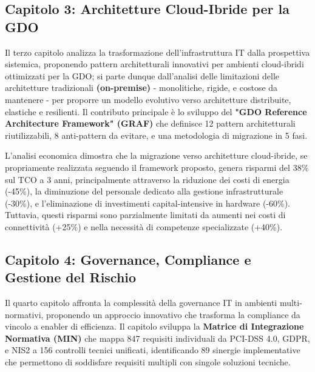 
\subsection{Capitolo 3: Architetture Cloud-Ibride per la GDO}

Il terzo capitolo analizza la trasformazione dell'infrastruttura IT dalla prospettiva sistemica, proponendo pattern architetturali innovativi per ambienti cloud-ibridi ottimizzati per la GDO; si parte dunque dall'analisi delle limitazioni delle architetture tradizionali \textbf{(on-premise)} - monolitiche, rigide, e costose da mantenere - per proporre un modello evolutivo verso architetture distribuite, elastiche e resilienti. Il contributo principale è lo sviluppo del \textbf{"GDO Reference Architecture Framework" (GRAF)} che definisce 12 pattern architetturali riutilizzabili, 8 anti-pattern da evitare, e una metodologia di migrazione in 5 fasi.

L'analisi economica dimostra che la migrazione verso architetture cloud-ibride, se propriamente realizzata seguendo il framework proposto, genera risparmi del 38\% sul TCO a 3 anni, principalmente attraverso la riduzione dei costi di energia (-45\%), la diminuzione del personale dedicato alla gestione infrastrutturale (-30\%), e l'eliminazione di investimenti capital-intensive in hardware (-60\%). Tuttavia, questi risparmi sono parzialmente limitati da aumenti nei costi di connettività (+25\%) e nella necessità di competenze specializzate (+40\%).

\subsection{Capitolo 4: Governance, Compliance e Gestione del Rischio}

Il quarto capitolo affronta la complessità della governance IT in ambienti multi-normativi, proponendo un approccio innovativo che trasforma la compliance da vincolo a enabler di efficienza. Il capitolo sviluppa la \textbf{Matrice di Integrazione Normativa (MIN)} che mappa 847 requisiti individuali da PCI-DSS 4.0, GDPR, e NIS2 a 156 controlli tecnici unificati, identificando 89 sinergie implementative che permettono di soddisfare requisiti multipli con singole soluzioni tecniche.

